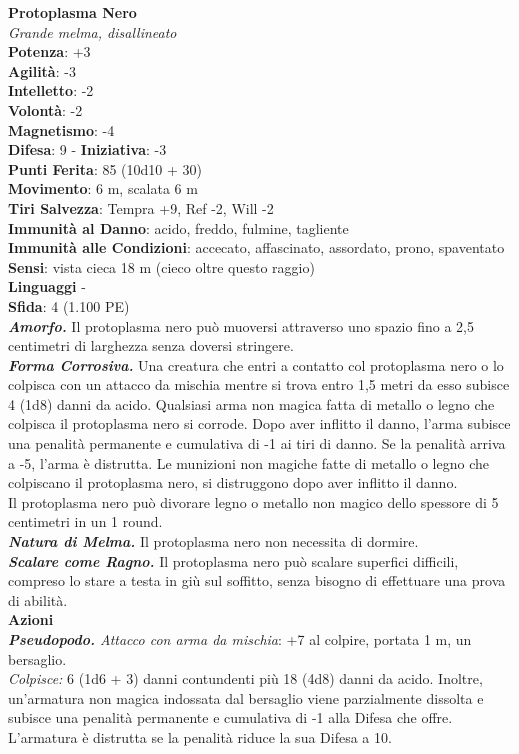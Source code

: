 \begin{multicols}{2}
\medskip\textbf{Protoplasma Nero}\\
\emph{Grande melma, disallineato}\\
\textbf{Potenza}: +3\\
\textbf{Agilità}: -3\\
\textbf{Intelletto}: -2\\
\textbf{Volontà}: -2\\
\textbf{Magnetismo}: -4\\
\textbf{Difesa}: 9 - \textbf{Iniziativa}: -3\\
\textbf{Punti Ferita}: 85 (10d10 + 30)\\
\textbf{Movimento}: 6 m, scalata 6 m\\
\textbf{Tiri Salvezza}: Tempra +9, Ref -2, Will -2\\
\textbf{Immunità al Danno}: acido, freddo, fulmine, tagliente\\
\textbf{Immunità alle Condizioni}: accecato, affascinato, assordato, prono, spaventato
\textbf{Sensi}: vista cieca 18 m (cieco oltre questo raggio)\\
\textbf{Linguaggi} -\\
\textbf{Sfida}: 4 (1.100 PE)\smallskip\\
\emph{\textbf{Amorfo.}} Il protoplasma nero può muoversi attraverso uno spazio fino a 2,5 centimetri di larghezza senza doversi stringere.\\
\emph{\textbf{Forma Corrosiva.}} Una creatura che entri a contatto col protoplasma nero o lo colpisca con un attacco da mischia mentre si trova entro 1,5 metri da esso subisce 4 (1d8) danni da acido. Qualsiasi arma non magica fatta di metallo o legno che colpisca il protoplasma nero si corrode. Dopo aver inflitto il danno, l'arma subisce una penalità permanente e cumulativa di -1 ai tiri di danno. Se la penalità arriva a -5, l'arma è distrutta. Le munizioni non magiche fatte di metallo o legno che colpiscano il protoplasma nero, si distruggono dopo aver inflitto il danno. \\
Il protoplasma nero può divorare legno o metallo non magico dello spessore di 5 centimetri in un 1 round.\\
\emph{\textbf{Natura di Melma.}} Il protoplasma nero non necessita di dormire.\\
\emph{\textbf{Scalare come Ragno.}} Il protoplasma nero può scalare superfici difficili, compreso lo stare a testa in giù sul soffitto, senza bisogno di effettuare una prova di abilità.\\
\smallskip\textbf{Azioni}\\
\emph{\textbf{Pseudopodo.} Attacco con arma da mischia}: +7 al colpire, portata 1 m, un bersaglio.\\
\emph{Colpisce:} 6 (1d6 + 3) danni contundenti più 18 (4d8) danni da acido. Inoltre, un'armatura non magica indossata dal bersaglio viene parzialmente dissolta e subisce una penalità permanente e cumulativa di -1 alla Difesa che offre. L'armatura è distrutta se la penalità riduce la sua Difesa a 10.\\


\end{multicols}
